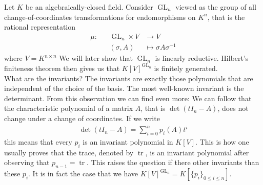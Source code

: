 \begin{dexample}
  Let $K$ be an algebraically-closed field.
  Consider $\operatorname{GL}_n$ viewed as the group of all change-of-coordinates transformations for endomorphisms on $K^n$, that is the rational representation
  \begin{equation}
    \begin{aligned}
      \mu \colon && \operatorname{GL}_n \times V  & \longrightarrow V \\
      && (\sigma,A) &\longmapsto \sigma A \sigma^{-1}
    \end{aligned}
  \end{equation}
  where $V = K^{n\times n}$
  We will later show that $\operatorname{GL}_n$ is linearly reductive.
  Hilbert's finiteness theorem then gives us that $K[V]^{\operatorname{GL}_n}$ is finitely generated.\\
  What are the invariants?
  The invariants are exactly those polynomials that are independent of the choice of the basis.
  The most well-known invariant is the determinant.
  From this observation we can find even more:
  We can follow that the characteristic polynomial of a matrix $A$, that is $\operatorname{det} (tI_n - A)$, does not change under a change of coordinates.
  If we write
  \begin{equation}
    \begin{aligned}
      \operatorname{det} (tI_n - A) = \sum_{i=0}^n p_i (A) t^i
    \end{aligned}
  \end{equation}
  this means that every $p_i$ is an invariant polynomial in $K[V]$.
  This is how one usually proves that the trace, denoted by $\operatorname{tr}$, is an invariant polynomial after observing that $p_{n-1} = \operatorname{tr}$.
  This raises the question if there other invariants than these $p_i$.
  It is in fact the case that we have $K[V]^{\operatorname{GL}_n} = K[\{p_i\}_{0\leq i\leq n}]$.
\end{dexample}
